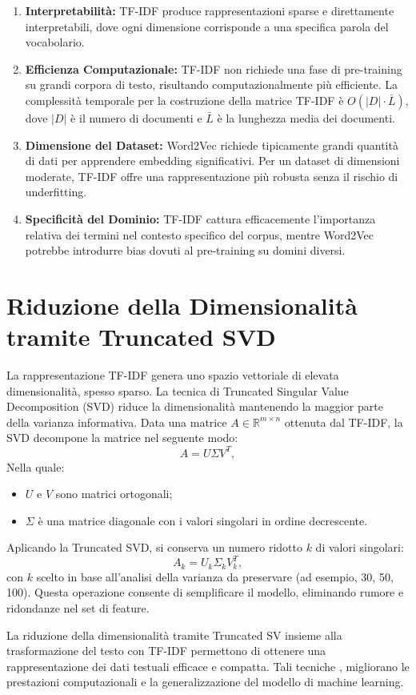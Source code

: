 \begin{enumerate}
    \item \textbf{Interpretabilità:} TF-IDF produce rappresentazioni sparse e direttamente interpretabili, dove ogni dimensione corrisponde a una specifica parola del vocabolario.
    \item \textbf{Efficienza Computazionale:} TF-IDF non richiede una fase di pre-training su grandi corpora di testo, risultando computazionalmente più efficiente. La complessità temporale per la costruzione della matrice TF-IDF è \(O(|D| \cdot \bar{L})\), dove \(|D|\) è il numero di documenti e \(\bar{L}\) è la lunghezza media dei documenti.

    \item \textbf{Dimensione del Dataset:} Word2Vec richiede tipicamente grandi quantità di dati per apprendere embedding significativi. Per un dataset di dimensioni moderate, TF-IDF offre una rappresentazione più robusta senza il rischio di underfitting.

    \item \textbf{Specificità del Dominio:} TF-IDF cattura efficacemente l'importanza relativa dei termini nel contesto specifico del corpus, mentre Word2Vec potrebbe introdurre bias dovuti al pre-training su domini diversi.
\end{enumerate}

\section{Riduzione della Dimensionalità tramite Truncated SVD}
La rappresentazione TF-IDF genera uno spazio vettoriale di elevata dimensionalità, spesso sparso. La tecnica di Truncated Singular Value Decomposition (SVD) riduce la dimensionalità mantenendo la maggior parte della varianza informativa. Data una matrice \(A \in \mathbb{R}^{m \times n}\) ottenuta dal TF-IDF, la SVD decompone la matrice nel seguente modo:
\[
A = U \Sigma V^T,
\]
Nella quale:
\begin{itemize}
    \item \(U\) e \(V\) sono matrici ortogonali;
    \item \(\Sigma\) è una matrice diagonale con i valori singolari in ordine decrescente.
\end{itemize}
Aplicando la Truncated SVD, si conserva un numero ridotto \(k\) di valori singolari:
\[
A_k = U_k \Sigma_k V_k^T,
\]
con \(k\) scelto in base all'analisi della varianza da preservare (ad esempio, 30, 50, 100). Questa operazione consente di semplificare il modello, eliminando rumore e ridondanze nel set di feature.



La riduzione della dimensionalità tramite Truncated SV insieme alla trasformazione del testo con TF-IDF permettono di ottenere una rappresentazione dei dati testuali efficace e compatta. Tali tecniche , migliorano le prestazioni computazionali e la generalizzazione del modello di machine learning.